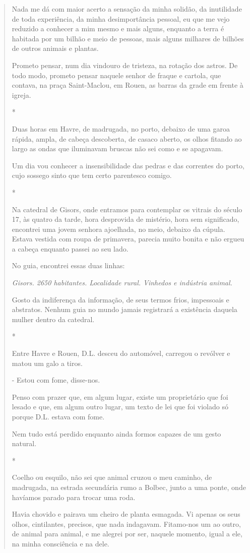 \begin{quote}
Nada me dá com maior acerto a sensação da minha solidão, da inutilidade
de toda experiência, da minha desimportância pessoal, eu que me vejo
reduzido a conhecer a mim mesmo e mais alguns, enquanto a terra é
habitada por um bilhão e meio de pessoas, mais alguns milhares de
bilhões de outros animais e plantas.

Prometo pensar, num dia vindouro de tristeza, na rotação dos astros. De
todo modo, prometo pensar naquele senhor de fraque e cartola, que
contava, na praça Saint-Maclou, em Rouen, as barras da grade em frente à
igreja.

*

Duas horas em Havre, de madrugada, no porto, debaixo de uma garoa
rápida, ampla, de cabeça descoberta, de casaco aberto, os olhos fitando
ao largo as ondas que iluminavam bruscas não sei como e se apagavam.

Um dia vou conhecer a insensibilidade das pedras e das correntes do
porto, cujo sossego sinto que tem certo parentesco comigo.

*

Na catedral de Gisors, onde entramos para contemplar os vitrais do
século 17, às quatro da tarde, hora desprovida de mistério, hora sem
significado, encontrei uma jovem senhora ajoelhada, no meio, debaixo da
cúpula. Estava vestida com roupa de primavera, parecia muito bonita e
não ergueu a cabeça enquanto passei ao seu lado.

No guia, encontrei essas duas linhas:

\emph{Gisors. 2650 habitantes. Localidade rural. Vinhedos e indústria
animal.}

Gosto da indiferença da informação, de seus termos frios, impessoais e
abstratos. Nenhum guia no mundo jamais registrará a existência daquela
mulher dentro da catedral.

*

Entre Havre e Rouen, D.L. desceu do automóvel, carregou o revólver e
matou um galo a tiros.

- Estou com fome, disse-nos.

Penso com prazer que, em algum lugar, existe um proprietário que foi
lesado e que, em algum outro lugar, um texto de lei que foi violado só
porque D.L. estava com fome.

Nem tudo está perdido enquanto ainda formos capazes de um gesto natural.

*

Coelho ou esquilo, não sei que animal cruzou o meu caminho, de
madrugada, na estrada secundária rumo a Bolbec, junto a uma ponte, onde
havíamos parado para trocar uma roda.

Havia chovido e pairava um cheiro de planta esmagada. Vi apenas os seus
olhos, cintilantes, precisos, que nada indagavam. Fitamo-nos um ao
outro, de animal para animal, e me alegrei por ser, naquele momento,
igual a ele, na minha consciência e na dele.
\end{quote}

